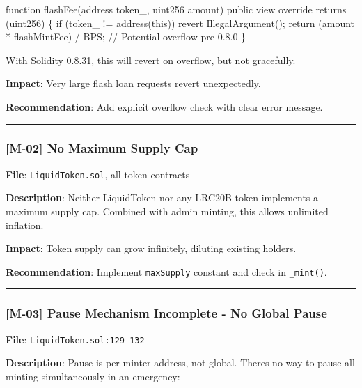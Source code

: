 \documentclass[
]{article}
\newenvironment{Shaded}{}{}
\newcommand{\NormalTok}[1]{#1}
\begin{document}
\begin{Shaded}
\begin{Highlighting}[]
\NormalTok{function flashFee(address token\_, uint256 amount) public view override returns (uint256) \{}
\NormalTok{    if (token\_ != address(this)) revert IllegalArgument();}
\NormalTok{    return (amount * flashMintFee) / BPS;  // Potential overflow pre{-}0.8.0}
\NormalTok{\}}
\end{Highlighting}
\end{Shaded}

With Solidity 0.8.31, this will revert on overflow, but not gracefully.

\textbf{Impact}: Very large flash loan requests revert unexpectedly.

\textbf{Recommendation}: Add explicit overflow check with clear error
message.

\begin{center}\rule{0.5\linewidth}{0.5pt}\end{center}

\subsubsection{{[}M-02{]} No Maximum Supply
Cap}\label{m-02-no-maximum-supply-cap}

\textbf{File}: \texttt{LiquidToken.sol}, all token contracts

\textbf{Description}: Neither LiquidToken nor any LRC20B token
implements a maximum supply cap. Combined with admin minting, this
allows unlimited inflation.

\textbf{Impact}: Token supply can grow infinitely, diluting existing
holders.

\textbf{Recommendation}: Implement \texttt{maxSupply} constant and check
in \texttt{\_mint()}.

\begin{center}\rule{0.5\linewidth}{0.5pt}\end{center}

\subsubsection{{[}M-03{]} Pause Mechanism Incomplete - No Global
Pause}\label{m-03-pause-mechanism-incomplete---no-global-pause}

\textbf{File}: \texttt{LiquidToken.sol:129-132}

\textbf{Description}: Pause is per-minter address, not global.
There\textquotesingle s no way to pause all minting simultaneously in an
emergency:
\end{document}
